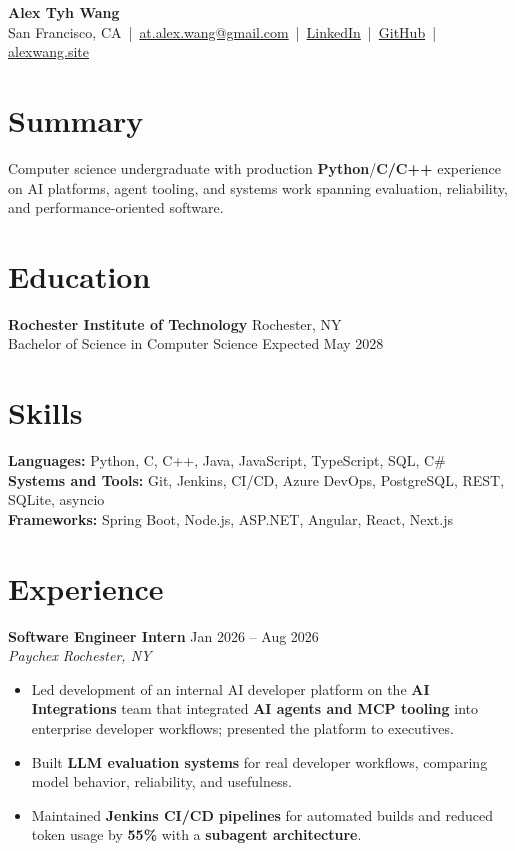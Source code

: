 \documentclass[10pt,letterpaper]{article}
\newcommand{\resumeRole}[4]{%
  \textbf{#1} \hfill #2\\
  \textit{#3} \hfill \textit{#4}
}
\newcommand{\majorGap}{\vspace{1pt plus 2fill}}
\begin{document}
\begin{center}
{\Large \textbf{Alex Tyh Wang}}\\
San Francisco, CA \,|\, \href{mailto:at.alex.wang@gmail.com}{at.alex.wang@gmail.com} \,|\, \href{https://www.linkedin.com/in/alex-tyh-wang/}{LinkedIn} \,|\, \href{https://github.com/alextyhwang}{GitHub} \,|\, \href{https://alexwang.site}{alexwang.site}
\end{center}

\section*{Summary}
Computer science undergraduate with production \textbf{Python}/\textbf{C/C++} experience on AI platforms, agent tooling, and systems work spanning evaluation, reliability, and performance-oriented software.

\majorGap
\section*{Education}
\textbf{Rochester Institute of Technology} \hfill Rochester, NY\\
Bachelor of Science in Computer Science \hfill Expected May 2028

\majorGap
\section*{Skills}
\textbf{Languages:} Python, C, C++, Java, JavaScript, TypeScript, SQL, C\#\\
\textbf{Systems and Tools:} Git, Jenkins, CI/CD, Azure DevOps, PostgreSQL, REST, SQLite, asyncio\\
\textbf{Frameworks:} Spring Boot, Node.js, ASP.NET, Angular, React, Next.js

\majorGap
\section*{Experience}
\resumeRole{Software Engineer Intern}{Jan 2026 -- Aug 2026}{Paychex}{Rochester, NY}
\begin{itemize}
  \item Led development of an internal AI developer platform on the \textbf{AI Integrations} team that integrated \textbf{AI agents and MCP tooling} into enterprise developer workflows; presented the platform to executives.
  \item Built \textbf{LLM evaluation systems} for real developer workflows, comparing model behavior, reliability, and usefulness.
  \item Maintained \textbf{Jenkins CI/CD pipelines} for automated builds and reduced token usage by \textbf{55\%} with a \textbf{subagent architecture}.
\end{itemize}
\end{document}
